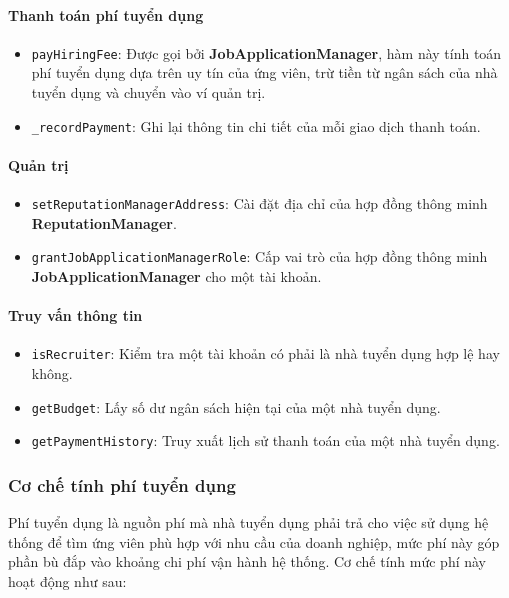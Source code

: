 \paragraph{Thanh toán phí tuyển dụng}

\begin{itemize}
  \item \texttt{payHiringFee}: Được gọi bởi \textbf{JobApplicationManager}, hàm này tính toán phí tuyển dụng dựa trên uy tín của ứng viên, trừ tiền từ ngân sách của nhà tuyển dụng và chuyển vào ví quản trị.
  \item \texttt{\_recordPayment}: Ghi lại thông tin chi tiết của mỗi giao dịch thanh toán.
\end{itemize}

\paragraph{Quản trị}

\begin{itemize}
  \item \texttt{setReputationManagerAddress}: Cài đặt địa chỉ của hợp đồng thông minh \textbf{ReputationManager}.
  \item \texttt{grantJobApplicationManagerRole}: Cấp vai trò của hợp đồng thông minh \textbf{JobApplicationManager} cho một tài khoản.
\end{itemize}

\paragraph{Truy vấn thông tin}

\begin{itemize}
  \item \texttt{isRecruiter}: Kiểm tra một tài khoản có phải là nhà tuyển dụng hợp lệ hay không.
  \item \texttt{getBudget}: Lấy số dư ngân sách hiện tại của một nhà tuyển dụng.
  \item \texttt{getPaymentHistory}: Truy xuất lịch sử thanh toán của một nhà tuyển dụng.
\end{itemize}

\subsubsection{Cơ chế tính phí tuyển dụng}

Phí tuyển dụng là nguồn phí mà nhà tuyển dụng phải trả cho việc sử dụng hệ thống để tìm ứng viên phù hợp với nhu cầu của doanh nghiệp, mức phí này góp phần bù đắp vào khoảng chi phí vận hành hệ thống. Cơ chế tính mức phí này hoạt động như sau:

